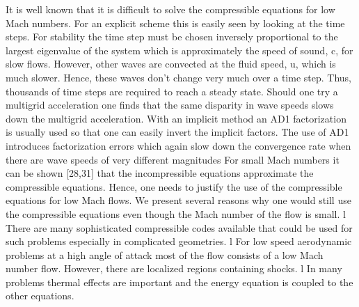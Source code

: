 \documentclass[preprint,10pt]{elsarticle}
\begin{document}
It is well known that it is difficult to solve the compressible equations for low Mach numbers.
For an explicit scheme this is easily seen by looking at the time steps. For stability the time
step must be chosen inversely proportional to the largest eigenvalue of the system which is
approximately the speed of sound, c, for slow flows. However, other waves are convected at the
fluid speed, u, which is much slower. Hence, these waves don’t change very much over a time
step. Thus, thousands of time steps are required to reach a steady state. Should one try a
multigrid acceleration one finds that the same disparity in wave speeds slows down the
multigrid acceleration. With an implicit method an AD1 factorization is usually used so that
one can easily invert the implicit factors. The use of AD1 introduces factorization errors which
again slow down the convergence rate when there are wave speeds of very different magnitudes
For small Mach numbers it can be shown [28,31] that the incompressible equations approximate
the compressible equations. Hence, one needs to justify the use of the compressible
equations for low Mach flows. We present several reasons why one would still use the
compressible equations even though the Mach number of the flow is small.
l There are many sophisticated compressible codes available that could be used for such
problems especially in complicated geometries.
l For low speed aerodynamic problems at a high angle of attack most of the flow consists of
a low Mach number flow. However, there are localized regions containing shocks.
l In many problems thermal effects are important and the energy equation is coupled to the
other equations.
\end{document}

